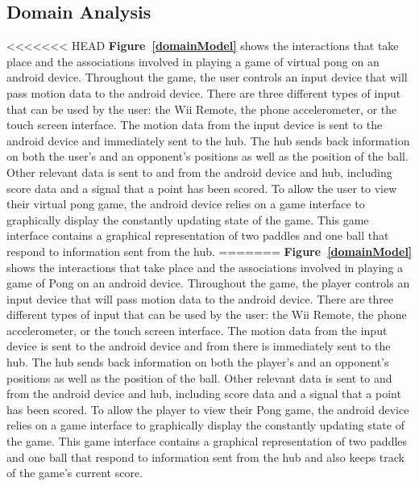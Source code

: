 \documentclass[12pt]{article}
\newenvironment{itemize*}%
  {\begin{itemize}%
  	\setlength{\parsep}{0pt}
    \setlength{\itemsep}{0pt}%
    \setlength{\parskip}{0pt}}%
  {\end{itemize}}
\begin{document}
\begin{itemize*}
\section{Domain Analysis}
<<<<<<< HEAD
\textbf{Figure~\ref{domainModel}} shows the interactions that take place and the associations involved in playing a game of virtual pong on an android device.  Throughout the game, the user controls an input device that will pass motion data to the android device.  There are three different types of input that can be used by the user: the Wii Remote, the phone accelerometer, or the touch screen interface.  The motion data from the input device is sent to the android device and immediately sent to the hub.  The hub sends back information on both the user's and an opponent's positions as well as the position of the ball.  Other relevant data is sent to and from the android device and hub, including score data and a signal that a point has been scored.  To allow the user to view their virtual pong game, the android device relies on a game interface to graphically display the constantly updating state of the game.  This game interface contains a graphical representation of two paddles and one ball that respond to information sent from the hub.
=======
\textbf{Figure~\ref{domainModel}} shows the interactions that take place and the associations involved in playing a game of Pong on an android device.  Throughout the game, the player controls an input device that will pass motion data to the android device.  There are three different types of input that can be used by the user: the Wii Remote, the phone accelerometer, or the touch screen interface.  The motion data from the input device is sent to the android device and from there is immediately sent to the hub.  The hub sends back information on both the player's and an opponent's positions as well as the position of the ball.  Other relevant data is sent to and from the android device and hub, including score data and a signal that a point has been scored.  To allow the player to view their Pong game, the android device relies on a game interface to graphically display the constantly updating state of the game.  This game interface contains a graphical representation of two paddles and one ball that respond to information sent from the hub and also keeps track of the game's current score.

\end{itemize*}
\end{document}
